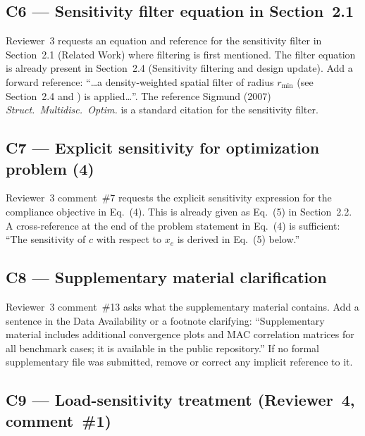 \documentclass[12pt,a4paper]{article}
\begin{document}
\subsection{C6 — Sensitivity filter equation in Section~2.1}

Reviewer~3 requests an equation and reference for the sensitivity filter
in Section~2.1 (Related Work) where filtering is first mentioned. The
filter equation is already present in Section~2.4 (Sensitivity filtering
and design update). Add a forward reference: ``\ldots a density-weighted
spatial filter of radius $r_{\min}$ (see Section~2.4 and
\cite{Sigmund2007}) is applied\ldots''. The reference Sigmund (2007)
\emph{Struct.\ Multidisc.\ Optim.} is a standard citation for the
sensitivity filter.

\subsection{C7 — Explicit sensitivity for optimization problem (4)}

Reviewer~3 comment~\#7 requests the explicit sensitivity expression for
the compliance objective in Eq.~(4). This is already given as Eq.~(5) in
Section~2.2. A cross-reference at the end of the problem statement in
Eq.~(4) is sufficient: ``The sensitivity of $c$ with respect to $x_e$ is
derived in Eq.~(5) below.''

\subsection{C8 — Supplementary material clarification}

Reviewer~3 comment~\#13 asks what the supplementary material contains.
Add a sentence in the Data Availability or a footnote clarifying:
``Supplementary material includes additional convergence plots and MAC
correlation matrices for all benchmark cases; it is available in the
public repository.''  If no formal supplementary file was submitted,
remove or correct any implicit reference to it.

\subsection{C9 — Load-sensitivity treatment (Reviewer~4, comment~\#1)}
\end{document}
